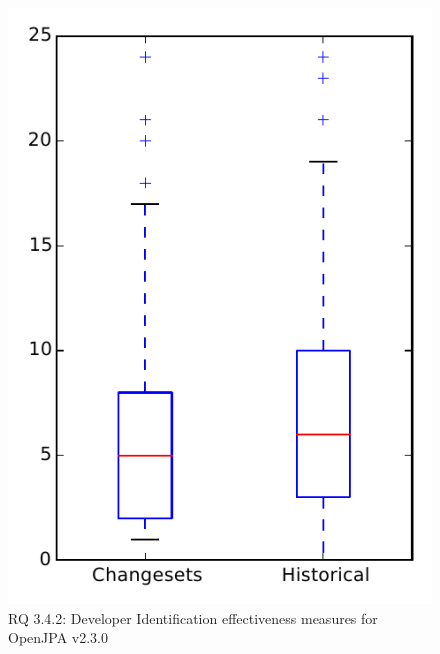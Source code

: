 
\begin{figure}
\centering
\includegraphics[height=0.4\textheight]{figures/dit/rq2_openjpa}
\caption{RQ 3.4.2: Developer Identification effectiveness measures for OpenJPA v2.3.0}
\label{fig:dit:rq2:openjpa}
\end{figure}
